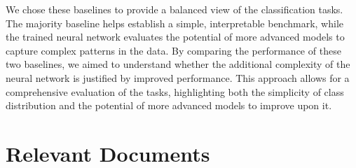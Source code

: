 \documentclass[titlepage]{article}
\begin{document}
We chose these baselines to provide a balanced view of the
classification tasks. The majority baseline helps establish a simple,
interpretable benchmark, while the trained neural network evaluates
the potential of more advanced models to capture complex patterns in
the data. By comparing the performance of these two baselines, we
aimed to understand whether the additional complexity of the neural
network is justified by improved performance. This approach allows
for a comprehensive evaluation of the tasks, highlighting both the
simplicity of class distribution and the potential of more advanced
models to improve upon it.
\section{Relevant Documents}
\end{document}
